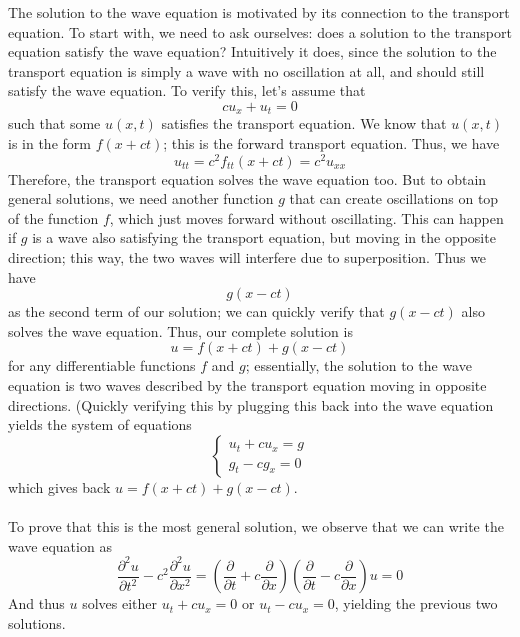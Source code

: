 \documentclass{article}
\begin{document}
The solution to the wave equation is motivated by its connection to the transport equation. To start with, we need to ask ourselves: does a solution to the transport equation satisfy the wave equation? Intuitively it does, since the solution to the transport equation is simply a wave with no oscillation at all, and should still satisfy the wave equation. To verify this, let's assume that 
\begin{equation*}
    cu_x + u_t=0
\end{equation*}
such that some $u(x,t)$ satisfies the transport equation. We know that $u(x,t)$ is in the form $f(x+ct)$; this is the forward transport equation. Thus, we have 
\begin{equation*}
    u_{tt}=c^2f_{tt}(x+ct)=c^2 u_{xx}
\end{equation*}
Therefore, the transport equation solves the wave equation too. But to obtain general solutions, we need another function $g$ that can create oscillations on top of the function $f$, which just moves forward without oscillating. This can happen if $g$ is a wave also satisfying the transport equation, but moving in the opposite direction; this way, the two waves will interfere due to superposition. Thus we have 
\begin{equation*}
    g(x-ct)
\end{equation*}
as the second term of our solution; we can quickly verify that $g(x-ct)$ also solves the wave equation. Thus, our complete solution is 
\begin{equation*}
    u=f(x+ct)+g(x-ct)
\end{equation*}
for any differentiable functions $f$ and $g$; essentially, the solution to the wave equation is two waves described by the transport equation moving in opposite directions. (Quickly verifying this by plugging this back into the wave equation yields the system of equations 
\begin{equation*}
    \begin{cases}
        u_{t}+cu_x=g \\
        g_t-cg_x=0
    \end{cases}
\end{equation*}
which gives back $u=f(x+ct)+g(x-ct)$. \\ \\
To prove that this is the most general solution, we observe that we can write the wave equation as 
\begin{equation*}
    \frac{\partial^2 u}{\partial t^2} - c^2\frac{\partial^2 u}{\partial x^2} = (\frac{\partial}{\partial t} + c\frac{\partial}{\partial x})(\frac{\partial}{\partial t} - c\frac{\partial}{\partial x})u = 0
\end{equation*}
And thus $u$ solves either $u_t+cu_x=0$ or $u_t-cu_x=0$, yielding the previous two solutions.
\end{document}

